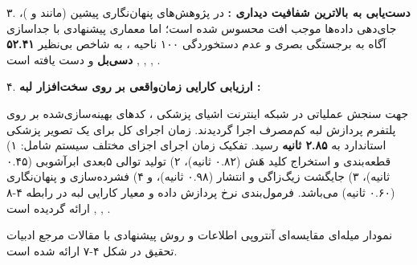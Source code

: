 ۳. \textbf{دست‌یابی به بالاترین شفافیت دیداری :} در پژوهش‌های پنهان‌نگاری پیشین (مانند  و )، جای‌دهی داده‌ها موجب افت محسوس  شده است؛ اما معماری پیشنهادی با جداسازی آگاه به برجستگی بصری  و عدم دستخوردگی ۱۰۰ ناحیه ، به شاخص بی‌نظیر \textbf{۵۲.۴۱ دسی‌بل} و \textbf{} دست یافته است , , , .\par

۴. \textbf{ارزیابی کارایی زمان‌واقعی بر روی سخت‌افزار لبه :}\par

جهت سنجش عملیاتی در شبکه اینترنت اشیای پزشکی ، کدهای بهینه‌سازی‌شده بر روی پلتفرم پردازش لبه کم‌مصرف  اجرا گردیدند. زمان اجرای کل برای یک تصویر پزشکی استاندارد به \textbf{۲.۸۵ ثانیه} رسید. تفکیک زمان اجرای اجزای مختلف سیستم شامل: ۱) قطعه‌بندی  و استخراج کلید هَش (۰.۸۲ ثانیه)، ۲) تولید توالی ۵بعدی ابرآشوبی (۰.۴۵ ثانیه)، ۳) جایگشت زیگ‌زاگی و انتشار  (۰.۹۸ ثانیه)، و ۴) فشرده‌سازی  و پنهان‌نگاری  (۰.۶۰ ثانیه) می‌باشد. فرمول‌بندی نرخ پردازش داده  و معیار کارایی لبه در رابطه ۴{-}۸ ارائه گردیده است , , .\par






نمودار میله‌ای مقایسه‌ای آنتروپی اطلاعات و  روش پیشنهادی با مقالات مرجع ادبیات تحقیق در شکل ۴{-}۷ ارائه شده است.\par



